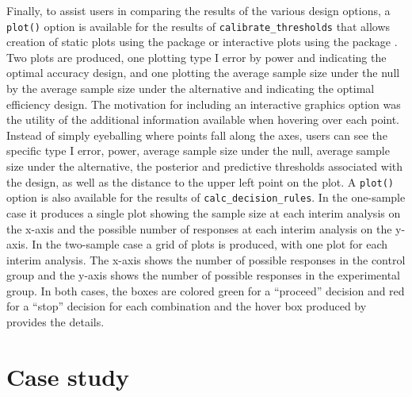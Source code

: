 Finally, to assist users in comparing the results of the various design
options, a \texttt{plot()} option is available for the results of
\texttt{calibrate\_thresholds} that allows creation of static plots
using the  package \citep{Wickham2016} or interactive
plots using the  package \citep{Sievert2020}. Two plots
are produced, one plotting type I error by power and indicating the
optimal accuracy design, and one plotting the average sample size under
the null by the average sample size under the alternative and indicating
the optimal efficiency design. The motivation for including an
interactive graphics option was the utility of the additional
information available when hovering over each point. Instead of simply
eyeballing where points fall along the axes, users can see the specific
type I error, power, average sample size under the null, average sample
size under the alternative, the posterior and predictive thresholds
associated with the design, as well as the distance to the upper left
point on the plot. A \texttt{plot()} option is also available for the
results of \texttt{calc\_decision\_rules}. In the one-sample case it
produces a single plot showing the sample size at each interim analysis
on the x-axis and the possible number of responses at each interim
analysis on the y-axis. In the two-sample case a grid of plots is
produced, with one plot for each interim analysis. The x-axis shows the
number of possible responses in the control group and the y-axis shows
the number of possible responses in the experimental group. In both
cases, the boxes are colored green for a ``proceed'' decision and red
for a ``stop'' decision for each combination and the hover box produced
by  provides the details.

\hypertarget{case-study}{%
\section{Case study}\label{case-study}}

